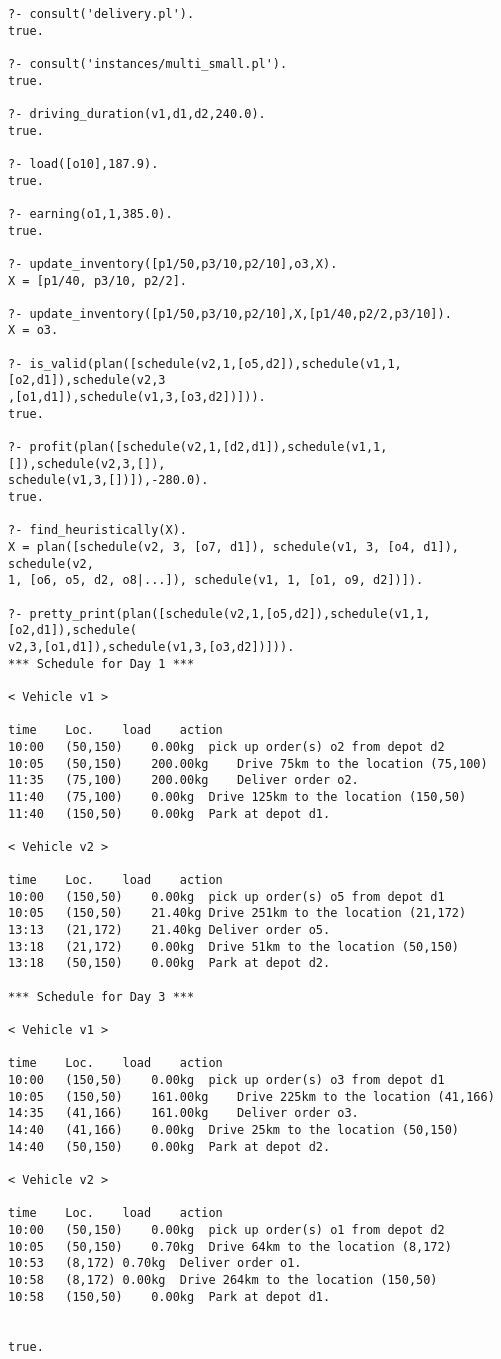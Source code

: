 \documentclass{article}
\begin{document}
\begin{lstlisting}[style=DOS]
?- consult('delivery.pl').
true.

?- consult('instances/multi_small.pl').
true.

?- driving_duration(v1,d1,d2,240.0).
true.

?- load([o10],187.9).
true.

?- earning(o1,1,385.0).
true.

?- update_inventory([p1/50,p3/10,p2/10],o3,X).
X = [p1/40, p3/10, p2/2].

?- update_inventory([p1/50,p3/10,p2/10],X,[p1/40,p2/2,p3/10]).
X = o3.

?- is_valid(plan([schedule(v2,1,[o5,d2]),schedule(v1,1,[o2,d1]),schedule(v2,3
,[o1,d1]),schedule(v1,3,[o3,d2])])).
true.

?- profit(plan([schedule(v2,1,[d2,d1]),schedule(v1,1,[]),schedule(v2,3,[]),
schedule(v1,3,[])]),-280.0).
true.

?- find_heuristically(X).
X = plan([schedule(v2, 3, [o7, d1]), schedule(v1, 3, [o4, d1]), schedule(v2,
1, [o6, o5, d2, o8|...]), schedule(v1, 1, [o1, o9, d2])]).

?- pretty_print(plan([schedule(v2,1,[o5,d2]),schedule(v1,1,[o2,d1]),schedule(
v2,3,[o1,d1]),schedule(v1,3,[o3,d2])])).
*** Schedule for Day 1 ***

< Vehicle v1 >

time	Loc.	load	action
10:00	(50,150)	0.00kg	pick up order(s) o2 from depot d2
10:05	(50,150)	200.00kg	Drive 75km to the location (75,100)
11:35	(75,100)	200.00kg	Deliver order o2.
11:40	(75,100)	0.00kg	Drive 125km to the location (150,50)
11:40	(150,50)	0.00kg	Park at depot d1.

< Vehicle v2 >

time	Loc.	load	action
10:00	(150,50)	0.00kg	pick up order(s) o5 from depot d1
10:05	(150,50)	21.40kg	Drive 251km to the location (21,172)
13:13	(21,172)	21.40kg	Deliver order o5.
13:18	(21,172)	0.00kg	Drive 51km to the location (50,150)
13:18	(50,150)	0.00kg	Park at depot d2.

*** Schedule for Day 3 ***

< Vehicle v1 >

time	Loc.	load	action
10:00	(150,50)	0.00kg	pick up order(s) o3 from depot d1
10:05	(150,50)	161.00kg	Drive 225km to the location (41,166)
14:35	(41,166)	161.00kg	Deliver order o3.
14:40	(41,166)	0.00kg	Drive 25km to the location (50,150)
14:40	(50,150)	0.00kg	Park at depot d2.

< Vehicle v2 >

time	Loc.	load	action
10:00	(50,150)	0.00kg	pick up order(s) o1 from depot d2
10:05	(50,150)	0.70kg	Drive 64km to the location (8,172)
10:53	(8,172)	0.70kg	Deliver order o1.
10:58	(8,172)	0.00kg	Drive 264km to the location (150,50)
10:58	(150,50)	0.00kg	Park at depot d1.


true.

\end{lstlisting}
\end{document}

